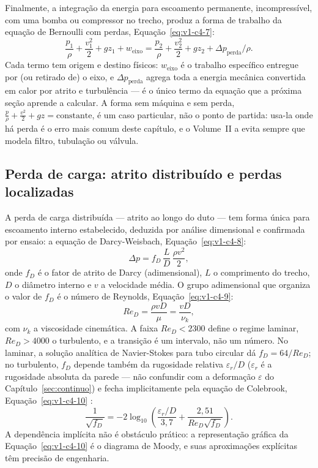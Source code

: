 \documentclass[12pt,a4paper]{article}
\numberwithin{equation}{section}
\numberwithin{table}{section}
\numberwithin{figure}{section}
\begin{document}
Finalmente, a integração da energia para escoamento permanente,
incompressível, com uma bomba ou compressor no trecho, produz a forma de
trabalho da equação de Bernoulli com perdas, Equação~\eqref{eq:v1-c4-7}:
\begin{equation}\label{eq:v1-c4-7}
\frac{p_1}{\rho} + \frac{v_1^2}{2} + g z_1 + w_{\text{eixo}} =
\frac{p_2}{\rho} + \frac{v_2^2}{2} + g z_2 + \Delta p_{\text{perda}}/\rho .
\end{equation}
Cada termo tem origem e destino físicos: $w_{\text{eixo}}$ é o trabalho
específico entregue por (ou retirado de) o eixo, e $\Delta p_{\text{perda}}$
agrega toda a energia mecânica convertida em calor por atrito e turbulência ---
é o único termo da equação que a próxima seção aprende a calcular. A forma
sem máquina e sem perda, $\tfrac{p}{\rho} + \tfrac{v^2}{2} + gz =
\text{constante}$, é um caso particular, não o ponto de partida: usa-la onde
há perda é o erro mais comum deste capítulo, e o Volume~II a evita sempre que
modela filtro, tubulação ou válvula.

\subsection{Perda de carga: atrito distribuído e perdas
localizadas}\label{sub:v1-c4-perda}

A perda de carga distribuída --- atrito ao longo do duto --- tem forma única
para escoamento interno estabelecido, deduzida por análise dimensional e
confirmada por ensaio: a equação de Darcy-Weisbach, Equação~\eqref{eq:v1-c4-8}:
\begin{equation}\label{eq:v1-c4-8}
\Delta p = f_D\,\frac{L}{D}\,\frac{\rho v^2}{2},
\end{equation}
onde $f_D$ é o fator de atrito de Darcy (adimensional), $L$ o comprimento do
trecho, $D$ o diâmetro interno e $v$ a velocidade média. O grupo adimensional
que organiza o valor de $f_D$ é o número de Reynolds,
Equação~\eqref{eq:v1-c4-9}:
\begin{equation}\label{eq:v1-c4-9}
Re_D = \frac{\rho v D}{\mu} = \frac{vD}{\nu_k},
\end{equation}
com $\nu_k$ a viscosidade cinemática. A faixa $Re_D < 2300$ define o regime
laminar, $Re_D > 4000$ o turbulento, e a transição é um intervalo, não um
número. No laminar, a solução analítica de
Navier-Stokes para tubo circular dá $f_D = 64/Re_D$; no turbulento, $f_D$
depende também da rugosidade relativa $\varepsilon_r/D$ ($\varepsilon_r$ é a
rugosidade absoluta da parede --- não confundir com a deformação
$\varepsilon$ do Capítulo~\ref{sec:continuo}) e fecha implicitamente pela
equação de Colebrook, Equação~\eqref{eq:v1-c4-10} \cite{white2011}:
\begin{equation}\label{eq:v1-c4-10}
\frac{1}{\sqrt{f_D}} = -2\log_{10}\!\left(\frac{\varepsilon_r/D}{3{,}7} +
\frac{2{,}51}{Re_D\sqrt{f_D}}\right).
\end{equation}
A dependência implícita não é obstáculo prático: a representação gráfica da
Equação~\eqref{eq:v1-c4-10} é o diagrama de Moody, e suas aproximações
explícitas têm precisão de engenharia.
\end{document}
